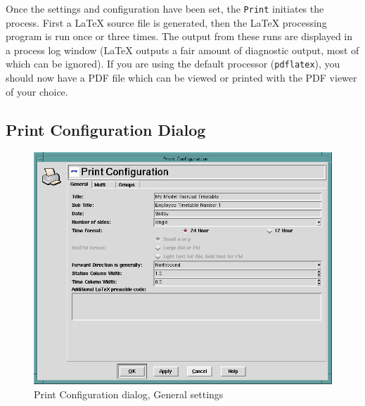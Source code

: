 Once the settings and configuration have been set, the \texttt{Print}
initiates the process.  First a \LaTeX{} source file is generated, then
the \LaTeX{} processing program is run once or three times.  The output
from these runs are displayed in a process log window (\LaTeX{} outputs
a fair amount of diagnostic output, most of which can be ignored).  If
you are using the default processor (\texttt{pdflatex}), you should now
have a PDF file which can be viewed or printed with the PDF viewer of
your choice.

\subsection{Print Configuration Dialog}
\label{sect:tt:PrintConfigurationDialog}

\begin{figure}[hbpt]
\begin{centering}
\includegraphics[width=5in]{TTPrintConfigurationDialog1.png}
\caption{Print Configuration dialog, General settings}
\label{fig:tt:PrintConfigurationDialog1}
\end{centering}
\end{figure}
